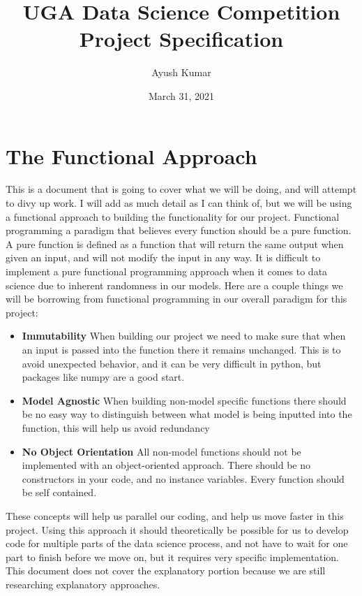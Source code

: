 \documentclass{article}
\title{UGA Data Science Competition Project Specification}
\author{Ayush Kumar}
\date{March 31, 2021}
\begin{document}
 
	
	\maketitle
	\tableofcontents
	\section{The Functional Approach }
	
		This is a document that is going to cover what we will be doing, and will attempt to divy up work. 
	I will add as much detail as I can think of, but we will be using a functional approach to building
	the functionality for our project. Functional programming a paradigm that believes every function should
	be a pure function. A pure function is defined as a function that will return the same output when given an 
	input, and will not modify the input in any way. It is difficult to implement a pure functional programming 
	approach when it comes to data science due to inherent randomness in our models. Here are a couple things 
	we will be borrowing from functional programming in our overall paradigm for this project: 
	
	\begin{itemize}
		\item \textbf{Immutability} When building our project we need to make sure that when an input is passed 
		into the function there it remains unchanged. This is to avoid unexpected behavior, and it can be very 
		difficult in python, but packages like numpy are a good start. 
		\item \textbf{Model Agnostic} When building non-model specific functions there should be no easy way to 
		distinguish between what model is being inputted into the function, this will help us avoid redundancy
		\item \textbf{No Object Orientation} All non-model functions should not be implemented with an object-oriented 
		approach. There should be no constructors in your code, and no instance variables. Every function should be 
		self contained.  
	\end{itemize}

	These concepts will help us parallel our coding, and help us move faster in this project. Using this approach 
	it should theoretically be possible for us to develop code for multiple parts of the data science process, and 
	not have to wait for one part to finish before we move on, but it requires very specific implementation. This document 
	does not cover the explanatory portion because we are still researching explanatory approaches. 
	
\end{document}
